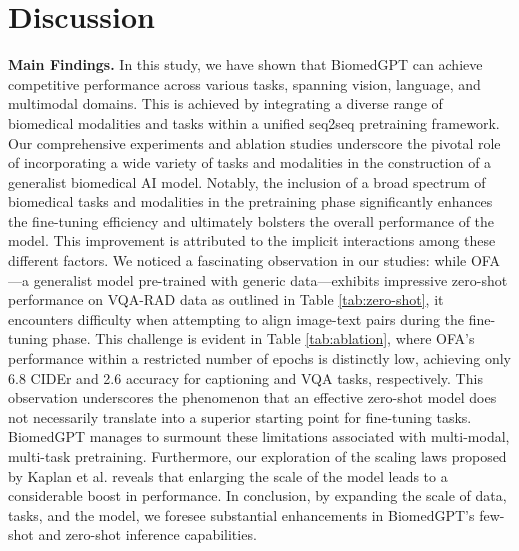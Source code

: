 \documentclass[10pt]{article} \usepackage[preprint]{tmlr}
\begin{document}
\section{Discussion} 
\label{sec:discussion}


\noindent \textbf{Main Findings.} In this study, we have shown that BiomedGPT can achieve competitive performance across various tasks, spanning vision, language, and multimodal domains. This is achieved by integrating a diverse range of biomedical modalities and tasks within a unified seq2seq pretraining framework. Our comprehensive experiments and ablation studies underscore the pivotal role of incorporating a wide variety of tasks and modalities in the construction of a generalist biomedical AI model. Notably, the inclusion of a broad spectrum of biomedical tasks and modalities in the pretraining phase significantly enhances the fine-tuning efficiency and ultimately bolsters the overall performance of the model. This improvement is attributed to the implicit interactions among these different factors. We noticed a fascinating observation in our studies: while OFA---a generalist model pre-trained with generic data---exhibits impressive zero-shot performance on VQA-RAD data as outlined in Table \ref{tab:zero-shot}, it encounters difficulty when attempting to align image-text pairs during the fine-tuning phase. This challenge is evident in Table \ref{tab:ablation}, where OFA's performance within a restricted number of epochs is distinctly low, achieving only 6.8 CIDEr and 2.6 accuracy for captioning and VQA tasks, respectively. This observation underscores the phenomenon that an effective zero-shot model does not necessarily translate into a superior starting point for fine-tuning tasks. BiomedGPT manages to surmount these limitations associated with multi-modal, multi-task pretraining. Furthermore, our exploration of the scaling laws proposed by Kaplan et al. \citep{kaplan2020scaling} reveals that enlarging the scale of the model leads to a considerable boost in performance. In conclusion, by expanding the scale of data, tasks, and the model, we foresee substantial enhancements in BiomedGPT's few-shot and zero-shot inference capabilities.
\end{document}
